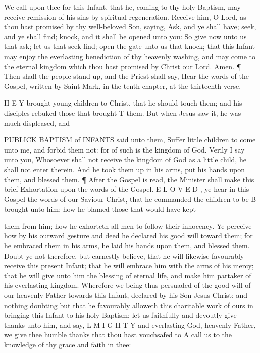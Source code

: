 We call upon thee for this Infant, that he, coming to thy holy Baptism, may receive remission of his sins by spiritual regeneration. Receive him, O Lord, as thou hast promised by thy well-beloved Son, saying, Ask, and ye shall have; seek, and ye shall find; knock, and it shall be opened unto you: So give now unto us that ask; let us that seek find; open the gate unto us that knock; that this Infant may enjoy the everlasting benediction of thy heavenly washing, and may come to the eternal kingdom which thou hast promised by Christ our Lord. Amen. ¶ Then shall the people stand up, and the Priest shall say, Hear the words of the Gospel, written by Saint Mark, in the tenth chapter, at the thirteenth verse.

H E Y brought young children to Christ, that he should touch them; and his disciples rebuked those that brought T them. But when Jesus saw it, he was much displeased, and

PUBLICK BAPTISM of INFANTS said unto them, Suffer little children to come unto me, and forbid them not: for of such is the kingdom of God. Verily I say unto you, Whosoever shall not receive the kingdom of God as a little child, he shall not enter therein. And he took them up in his arms, put his hands upon them, and blessed them. ¶ After the Gospel is read, the Minister shall make this brief Exhortation upon the words of the Gospel. E L O V E D , ye hear in this Gospel the words of our Saviour Christ, that he commanded the children to be B brought unto him; how he blamed those that would have kept

them from him; how he exhorteth all men to follow their innocency. Ye perceive how by his outward gesture and deed he declared his good will toward them; for he embraced them in his arms, he laid his hands upon them, and blessed them. Doubt ye not therefore, but earnestly believe, that he will likewise favourably receive this present Infant; that he will embrace him with the arms of his mercy; that he will give unto him the blessing of eternal life, and make him partaker of his everlasting kingdom. Wherefore we being thus persuaded of the good will of our heavenly Father towards this Infant, declared by his Son Jesus Christ; and nothing doubting but that he favourably alloweth this charitable work of ours in bringing this Infant to his holy Baptism; let us faithfully and devoutly give thanks unto him, and say, L M I G H T Y and everlasting God, heavenly Father, we give thee humble thanks that thou hast vouchsafed to A call us to the knowledge of thy grace and faith in thee:

